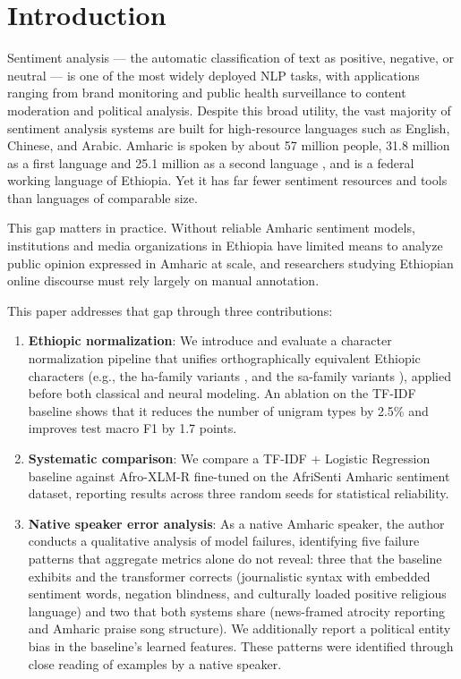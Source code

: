 
\section{Introduction}

Sentiment analysis --- the automatic classification of text as positive, negative, or neutral --- is one of the most widely deployed NLP tasks, with applications ranging from brand monitoring and public health surveillance to content moderation and political analysis. Despite this broad utility, the vast majority of sentiment analysis systems are built for high-resource languages such as English, Chinese, and Arabic. Amharic is spoken by about 57 million people, 31.8 million as a first language and 25.1 million as a second language \citep{eberhard-etal-2020-ethnologue}, and is a federal working language of Ethiopia. Yet it has far fewer sentiment resources and tools than languages of comparable size.

This gap matters in practice. Without reliable Amharic sentiment models, institutions and media organizations in Ethiopia have limited means to analyze public opinion expressed in Amharic at scale, and researchers studying Ethiopian online discourse must rely largely on manual annotation.

This paper addresses that gap through three contributions:

\begin{enumerate}
\def\labelenumi{\arabic{enumi}.}
\item
  \textbf{Ethiopic normalization}: We introduce and evaluate a character normalization pipeline that unifies orthographically equivalent Ethiopic characters (e.g., the ha-family variants , and the sa-family variants ), applied before both classical and neural modeling. An ablation on the TF-IDF baseline shows that it reduces the number of unigram types by 2.5\% and improves test macro F1 by 1.7 points.
\item
  \textbf{Systematic comparison}: We compare a TF-IDF + Logistic Regression baseline against Afro-XLM-R fine-tuned on the AfriSenti Amharic sentiment dataset, reporting results across three random seeds for statistical reliability.
\item
  \textbf{Native speaker error analysis}: As a native Amharic speaker, the author conducts a qualitative analysis of model failures, identifying five failure patterns that aggregate metrics alone do not reveal: three that the baseline exhibits and the transformer corrects (journalistic syntax with embedded sentiment words, negation blindness, and culturally loaded positive religious language) and two that both systems share (news-framed atrocity reporting and Amharic praise song structure). We additionally report a political entity bias in the baseline's learned features. These patterns were identified through close reading of examples by a native speaker.
\end{enumerate}

